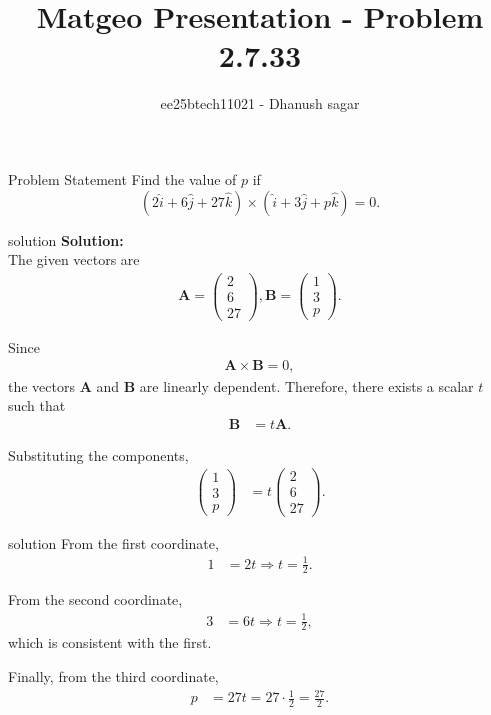 \documentclass{beamer}
\title{Matgeo Presentation - Problem 2.7.33}
\author{ee25btech11021 - Dhanush sagar}
\numberwithin{equation}{section}
\theoremstyle{remark}
\newcommand{\myvec}[1]{\ensuremath{\begin{pmatrix}#1\end{pmatrix}}}
\let\vec\mathbf
\begin{document}
	

		




\begin{frame}
  \titlepage
\end{frame}

\begin{frame}{Problem Statement}
   Find the value of $p$ if
\[
(2\hat{i} + 6\hat{j} + 27\hat{k}) \times (\hat{i} + 3\hat{j} + p\hat{k}) = 0.
\]
\end{frame}

\begin{frame}{solution}
 \textbf{Solution:} \\
The given vectors are
\begin{align}
\vec{A} = \myvec{2 \\ 6 \\ 27}, 
\vec{B} = \myvec{1 \\ 3 \\ p}.
\end{align}

Since
\begin{align}
\vec{A} \times \vec{B} = 0,
\end{align}
the vectors $\vec{A}$ and $\vec{B}$ are linearly dependent. Therefore, there exists a scalar $t$ such that
\begin{align}
\vec{B} &= t \vec{A}.
\end{align}

Substituting the components,
\begin{align}
\myvec{1 \\ 3 \\ p} &= t \myvec{2 \\ 6 \\ 27}.
\end{align}
\end{frame}
\begin{frame}{solution}
From the first coordinate,
\begin{align}
1 &= 2t  \Rightarrow  t = \tfrac{1}{2}.
\end{align}

From the second coordinate,
\begin{align}
3 &= 6t  \Rightarrow  t = \tfrac{1}{2},
\end{align}
which is consistent with the first.

Finally, from the third coordinate,
\begin{align}
p &= 27t = 27 \cdot \tfrac{1}{2} = \tfrac{27}{2}.
\end{align}



\end{frame}
\end{document}
